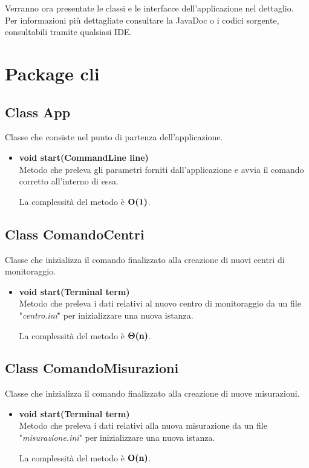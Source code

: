 \documentclass[a4paper, 12pt]{scrreprt}
\begin{document}
	Verranno ora presentate le classi e le interfacce dell'applicazione nel dettaglio. \\Per informazioni più dettagliate consultare la JavaDoc o i codici sorgente, consultabili tramite qualsiasi IDE.
	\pagebreak
		\section{Package cli}
			\subsection{Class App}
			Classe che consiste nel punto di partenza dell'applicazione.
			\begin{itemize}
				\item \textbf{void start(CommandLine line)}
				\\Metodo che preleva gli parametri forniti dall'applicazione e avvia il comando corretto all'interno di essa.
				
				La complessit\`a del metodo \`e $\mathbf{O}\textbf{(1)}$.
			\end{itemize}
			
			\subsection{Class ComandoCentri}
			Classe che inizializza il comando finalizzato alla creazione di nuovi centri di monitoraggio.
			\begin{itemize}
				\item \textbf{void start(Terminal term)}
				\\Metodo che preleva i dati relativi al nuovo centro di monitoraggio da un file "\textsl{centro.ini}" per inizializzare una nuova istanza.
				
				La complessit\`a del metodo \`e $\mathbf{\Theta}\textbf{(n)}$.
				
			\end{itemize}
			
			\subsection{Class ComandoMisurazioni}
			Classe che inizializza il comando finalizzato alla creazione di nuove misurazioni.
			\begin{itemize}
				\item \textbf{void start(Terminal term)}
				\\Metodo che preleva i dati relativi alla nuova misurazione da un file "\textsl{misurazione.ini}" per inizializzare una nuova istanza.
				
				La complessit\`a del metodo \`e $\mathbf{O}\textbf{(n)}$.
				
			\end{itemize}
			
\end{document}
